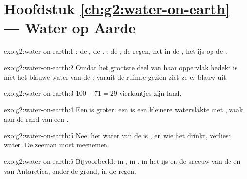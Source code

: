 \section*{Hoofdstuk \ref{ch:g2:water-on-earth} --- Water op Aarde}

\begin{solution}{exo:g2:water-on-earth:1}
: de , de . : de , de regen, het  in
de , het ijs op de .
\end{solution}

\begin{solution}{exo:g2:water-on-earth:2}
Omdat het grootste deel van haar oppervlak bedekt is met het blauwe water
van de : vanuit de ruimte gezien ziet ze er blauw uit.
\end{solution}

\begin{solution}{exo:g2:water-on-earth:3}
$100 - 71 = 29$ vierkantjes zijn land.
\end{solution}

\begin{solution}{exo:g2:water-on-earth:4}
Een  is groter: een  is een kleinere watervlakte met ,
vaak aan de rand van een .
\end{solution}

\begin{solution}{exo:g2:water-on-earth:5}
Nee: het water van de  is , en wie het drinkt, verliest
water. De zeeman moet  meenemen.
\end{solution}

\begin{solution}{exo:g2:water-on-earth:6}
Bijvoorbeeld: in , in , in het ijs en de sneeuw van de 
en van Antarctica, onder de grond, in de regen.
\end{solution}

